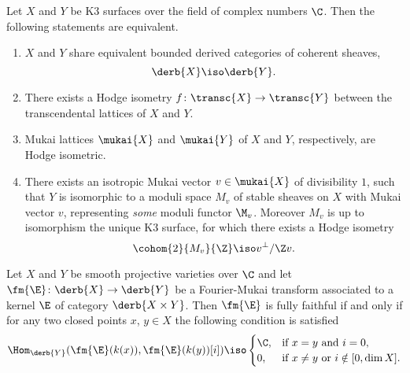 \begin{theorem}

    Let $X$ and $Y$ be K3 surfaces over the field of complex numbers $\C$. Then the following statements are equivalent.
    \begin{enumerate}[label = (\roman*)]
        \item{$X$ and $Y$ share equivalent bounded derived categories of coherent sheaves, 
        \[
            \derb{X} \iso \derb{Y}.
        \]
        }
        \item{There exists a Hodge isometry $f \colon \transc{X} \to \transc{Y}$ between the transcendental lattices of $X$ and $Y$.}
        \item{Mukai lattices $\mukai{X}$ and $\mukai{Y}$ of $X$ and $Y$, respectively, are Hodge isometric. 
        }
        \item{There exists 
        an isotropic Mukai vector $v \in \mukai{X}$ of divisibility $1$,
        such that $Y$ is isomorphic to a moduli space $M_v$ of stable sheaves on $X$ with Mukai vector $v$, representing \emph{some} moduli functor $\M_v$. Moreover $M_v$ is up to isomorphism the unique K3 surface, for which there exists a Hodge isometry
        \[
            \cohom{2}{M_v}{\Z} \iso v^\perp / \Z v.
        \]
        }
    \end{enumerate}
\end{theorem}

\begin{theorem}
    Let $X$ and $Y$ be smooth projective varieties over $\C$ and let $\fm{\E} \colon \derb{X} \to \derb{Y}$ be a Fourier-Mukai transform associated to a kernel $\E$ of category $\derb{X \times Y}$. Then $\fm{\E}$ is fully faithful if and only if for any two closed points $x$, $y \in X$ the following condition is satisfied
    \begin{equation}
        \label{eq: Bondal, Orlov conditions}
        \Hom_{\derb{Y}}(\fm{\E}(k(x)), \fm{\E}(k(y))[i]) \iso \begin{cases}
            \C, &\text{if $x = y$ and $i = 0$,} \\
            0, &\text{if $x \neq y$ or $i \notin [0, \dim X]$.}
        \end{cases}
    \end{equation}
\end{theorem}